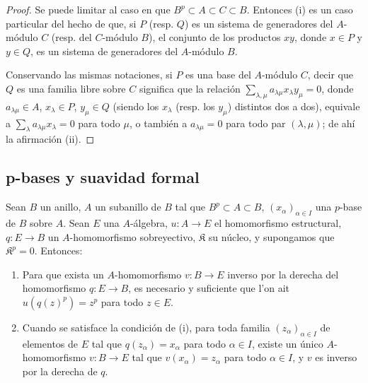 \begin{proof}
Se puede limitar al caso en que $B^p\subset A\subset C\subset B$. Entonces
(i) es un caso particular del hecho de que, si $P$ (resp. $Q$) es un sistema
de generadores del $A$-módulo $C$ (resp. del $C$-módulo $B$), el conjunto de
los productos $xy$, donde $x\in P$ y $y\in Q$, es un sistema de generadores
del $A$-módulo $B$.

Conservando las mismas notaciones, si $P$ es una base del $A$-módulo $C$,
decir que $Q$ es una familia libre sobre $C$ significa que la relación
$\sum_{\lambda,\mu}a_{\lambda\mu}x_\lambda y_\mu=0$, donde
$a_{\lambda\mu}\in A$, $x_\lambda\in P$, $y_\mu\in Q$ (siendo los
$x_\lambda$ (resp. los $y_\mu$) distintos dos a dos), equivale a
$\sum_\lambda a_{\lambda\mu}x_\lambda=0$ para todo $\mu$, o también a
$a_{\lambda\mu}=0$ para todo par $(\lambda,\mu)$; de ahí la
afirmación (ii).
\end{proof}

\subsection{p-bases y suavidad formal}
\label{0.21.2-fr}

\begin{theorem}[21.2.1]
\label{0.21.2.1-fr}
Sean $B$ un anillo, $A$ un subanillo de $B$ tal que $B^p\subset A\subset B$,
$(x_\alpha)_{\alpha\in I}$ una $p$-base de $B$ sobre $A$.
Sean $E$ una $A$-álgebra, $u:A\to E$ el homomorfismo estructural,
$q:E\to B$ un $A$-homomorfismo sobreyectivo, $\mathfrak K$ su núcleo, y
supongamos que $\mathfrak K^p=0$. Entonces:
\begin{enumerate}
  \item[\textup{(i)}] Para que exista un $A$-homomorfismo $v:B\to E$ inverso por la
  derecha del homomorfismo $q:E\to B$, es necesario y suficiente que l'on ait
  $u(q(z)^p)=z^p$ para todo $z\in E$.
  \item[\textup{(ii)}] Cuando se satisface la condición de \textup{(i)}, para toda familia
  $(z_\alpha)_{\alpha\in I}$ de elementos de $E$ tal que
  $q(z_\alpha)=x_\alpha$ para todo $\alpha\in I$, existe un único
  $A$-homomorfismo $v:B\to E$ tal que $v(x_\alpha)=z_\alpha$ para todo
  $\alpha\in I$, y $v$ es inverso por la derecha de $q$.
\end{enumerate}
\end{theorem}

